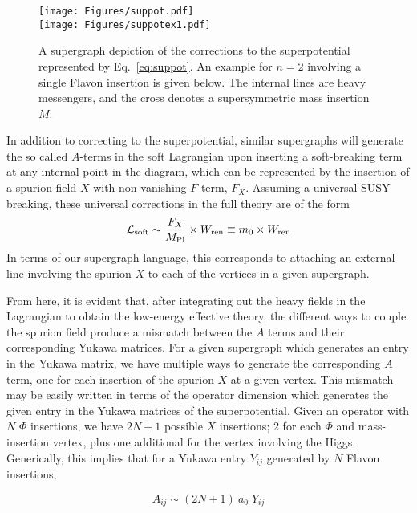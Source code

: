 \documentclass[a4paper,11pt]{article}
\begin{document}
\begin{figure} 
\center
\texttt{[image: Figures/suppot.pdf]} \\
\texttt{[image: Figures/suppotex1.pdf]}  %
\caption{A supergraph depiction of the corrections to the superpotential represented by Eq.~\ref{eq:suppot}. An example for $n=2$ involving a single Flavon insertion is given below. The internal lines are heavy messengers, and the cross denotes a supersymmetric mass insertion $M$.}
\label{fig:suppot}
\end{figure}

In addition to correcting to the superpotential, similar supergraphs will generate the so called $A$-terms in the soft Lagrangian upon inserting a soft-breaking term at any internal point in the diagram, which can be represented by the insertion of a spurion field $X$ with non-vanishing $F$-term, $F_X$. Assuming a universal SUSY breaking, these universal corrections in the full theory are of the form
%
\begin{equation} \nonumber
{\cal L}_{\rm soft} \sim \frac{F_X}{M_{\rm Pl}} \times W_{\rm ren} \equiv m_0 \times W_{\rm ren}
\end{equation} 
In terms of our supergraph language, this corresponds to attaching an external line involving the spurion $X$ to each of the vertices in a given supergraph. 

From here, it is evident that, after integrating out the heavy fields in the Lagrangian to obtain the low-energy effective theory, the different ways to couple the spurion field produce a mismatch between the $A$ terms and their corresponding Yukawa matrices. For a given supergraph which generates an entry in the Yukawa matrix, we have multiple ways to generate the corresponding $A$ term, one for each insertion of the spurion $X$ at a given vertex. This mismatch may be easily written in terms of the operator dimension which generates the given entry in the Yukawa matrices of the superpotential. Given an operator with $N$ $\Phi$ insertions, we have $2N+1$ possible $X$ insertions; 2 for each $\Phi$ and mass-insertion vertex, plus one additional for the vertex involving the Higgs. Generically, this implies that for a Yukawa entry $Y_{ij}$ generated by $N$ Flavon insertions, 

\begin{equation} \label{eq:amismatch}
A_{ij} \sim (2N+1)~ a_0\; Y_{ij}
\end{equation} 
\end{document}
